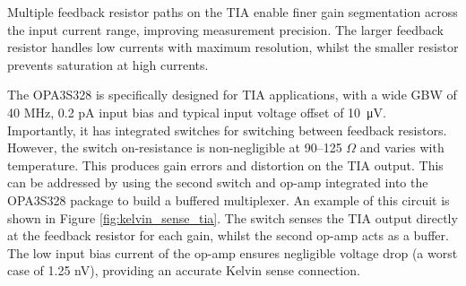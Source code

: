 
Multiple feedback resistor paths on the \ac{TIA} enable finer gain segmentation across the input current range, improving measurement precision. The larger feedback resistor handles low currents with maximum resolution, whilst the smaller resistor prevents saturation at high currents. 

The OPA3S328 is specifically designed for \ac{TIA} applications, with a wide GBW of 40 MHz, 0.2 pA input bias and typical input voltage offset of \SI{10}{\micro\volt}. Importantly, it has integrated switches for switching between feedback resistors. However, the switch on-resistance is non-negligible at 90--125 $\Omega$ and varies with temperature. This produces gain errors and distortion on the \ac{TIA} output. This can be addressed by using the second switch and op-amp integrated into the OPA3S328 package to build a buffered multiplexer. An example of this circuit is shown in Figure \ref{fig:kelvin_sense_tia}. The switch senses the \ac{TIA} output directly at the feedback resistor for each gain, whilst the second op-amp acts as a buffer. The low input bias current of the op-amp ensures negligible voltage drop (a worst case of 1.25 nV), providing an accurate Kelvin sense connection.



